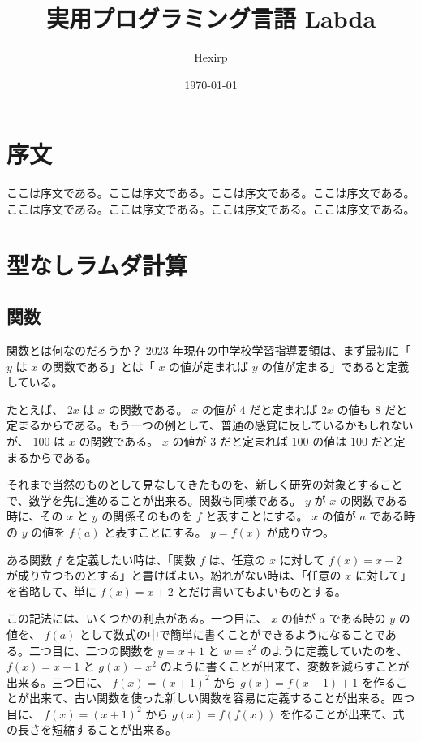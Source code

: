 \documentclass[book]{jlreq}
\title{実用プログラミング言語 Labda}
\author{Hexirp}
\date{\today}
\newcommand{\p}[1]{ \mathord{ \left( #1 \right) } }
\begin{document}
\maketitle

\chapter*{序文}

ここは序文である。ここは序文である。ここは序文である。ここは序文である。ここは序文である。ここは序文である。ここは序文である。ここは序文である。

\chapter{型なしラムダ計算}

\section{関数}

関数とは何なのだろうか？ 2023 年現在の中学校学習指導要領は、まず最初に「 \( y \) は \( x \) の関数である」とは「 \( x \) の値が定まれば \( y \) の値が定まる」であると定義している。

たとえば、 \( 2 x \) は \( x \) の関数である。 \( x \) の値が \( 4 \) だと定まれば \( 2 x \) の値も \( 8 \) だと定まるからである。もう一つの例として、普通の感覚に反しているかもしれないが、 \( 100 \) は \( x \) の関数である。 \( x \) の値が \( 3 \) だと定まれば \( 100 \) の値は \( 100 \) だと定まるからである。

それまで当然のものとして見なしてきたものを、新しく研究の対象とすることで、数学を先に進めることが出来る。関数も同様である。 \( y \) が \( x \) の関数である時に、その \( x \) と \( y \) の関係そのものを \( f \) と表すことにする。 \( x \) の値が \( a \) である時の \( y \) の値を \( f \p{ a } \) と表すことにする。 \( y = f \p{ x } \) が成り立つ。

ある関数 \( f \) を定義したい時は、「関数 \( f \) は、任意の \( x \) に対して \( f \p{ x } = x + 2 \) が成り立つものとする」と書けばよい。紛れがない時は、「任意の \( x \) に対して」を省略して、単に \( f \p{ x } = x + 2 \) とだけ書いてもよいものとする。

この記法には、いくつかの利点がある。一つ目に、 \( x \) の値が \( a \) である時の \( y \) の値を、 \( f \p{ a } \) として数式の中で簡単に書くことができるようになることである。二つ目に、二つの関数を \( y = x + 1 \) と \( w = z^2 \) のように定義していたのを、 \( f \p{ x } = x + 1 \) と \( g \p{ x } = x^2 \) のように書くことが出来て、変数を減らすことが出来る。三つ目に、 \( f \p{ x } = \p{ x + 1 }^2 \) から \( g \p{ x } = f \p{ x + 1 } + 1 \) を作ることが出来て、古い関数を使った新しい関数を容易に定義することが出来る。四つ目に、 \( f \p{ x } = \p{ x + 1 }^2 \) から \( g \p{ x } = f \p{ f \p{ x } } \) を作ることが出来て、式の長さを短縮することが出来る。
\end{document}
